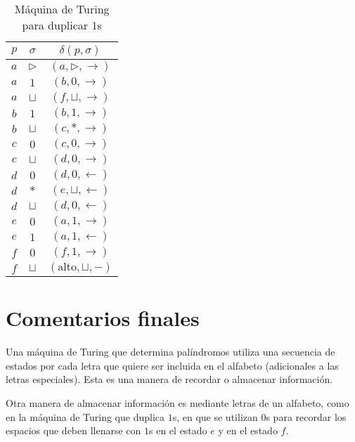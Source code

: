 \documentclass[paper=leter, fontsize=11pt]{scrartcl}
\numberwithin{equation}{section}		%
\numberwithin{figure}{section}			%
\numberwithin{table}{section}				%
\begin{document}
\begin{table}[]
	\caption{Máquina de Turing para duplicar $1$s}
	\label{duplicar}
	\centering
	\begin{tabular}{cc|c}
	$p$ & $\sigma$ & $\delta(p, \sigma)$ \\ \hline

	$a$ & $\triangleright$ & $(a, \triangleright, \rightarrow)$ \\
	$a$ & $1$ & $(b, 0, \rightarrow)$ \\
	$a$ & $\sqcup$ & $(f, \sqcup, \rightarrow)$ \\
	$b$ & $1$ & $(b, 1, \rightarrow)$ \\
	$b$ & $\sqcup$ & $(c, *, \rightarrow)$ \\
	$c$ & $0$ & $(c, 0, \rightarrow)$ \\
	$c$ & $\sqcup$ & $(d, 0, \rightarrow)$ \\
	$d$ & $0$ & $(d, 0, \leftarrow)$ \\
	$d$ & $*$ & $(e, \sqcup, \leftarrow)$ \\
	$d$ & $\sqcup$ & $(d, 0, \leftarrow)$ \\
	$e$ & $0$ & $(a, 1, \rightarrow)$ \\
	$e$ & $1$ & $(a, 1, \leftarrow)$ \\
	$f$ & $0$ & $(f, 1, \rightarrow)$ \\
	$f$ & $\sqcup$ & $(\text{alto}, \sqcup, -)$
	\end{tabular}
\end{table}

\section{Comentarios finales}

Una máquina de Turing que determina palíndromos utiliza una secuencia de estados por cada letra que quiere ser incluida en el alfabeto (adicionales a las letras especiales). Esta es una manera de recordar o almacenar información. 

Otra manera de almacenar información es mediante letras de un alfabeto, como en la máquina de Turing que duplica $1$s, en que se utilizan $0$s para recordar los espacios que deben llenarse con $1$s en el estado $e$ y en el estado $f$.



\end{document}
